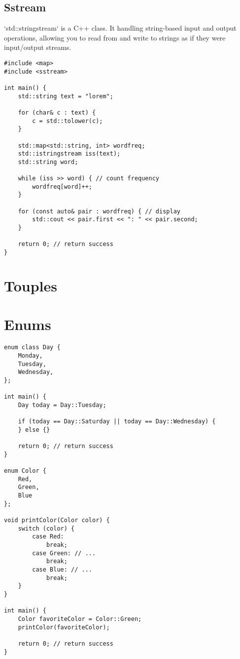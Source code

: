 \documentclass[openany]{report}
\begin{document}
\subsection{Sstream}

`std::stringstream` is a C++ class. It handling string-based input and output operations,
allowing you to read from and write to strings as if they were input/output streams.

\begin{verbatim}
#include <map>
#include <sstream>

int main() {
    std::string text = "lorem";

    for (char& c : text) {
        c = std::tolower(c);
    }

    std::map<std::string, int> wordfreq;
    std::istringstream iss(text);
    std::string word;

    while (iss >> word) { // count frequency
        wordfreq[word]++;
    }

    for (const auto& pair : wordfreq) { // display
        std::cout << pair.first << ": " << pair.second;
    }

    return 0; // return success
}
\end{verbatim}


\section{Touples}


\section{Enums}

\begin{verbatim}
enum class Day {
    Monday,
    Tuesday,
    Wednesday,
};

int main() {
    Day today = Day::Tuesday;

    if (today == Day::Saturday || today == Day::Wednesday) {
    } else {}

    return 0; // return success
}

enum Color {
    Red,
    Green,
    Blue
};

void printColor(Color color) {
    switch (color) {
        case Red:
            break;
        case Green: // ...
            break;
        case Blue: // ...
            break;
    }
}

int main() {
    Color favoriteColor = Color::Green;
    printColor(favoriteColor);

    return 0; // return success
}
\end{verbatim}
\end{document}
